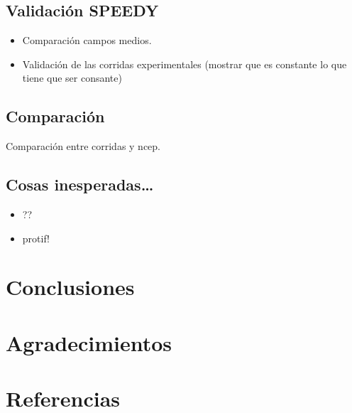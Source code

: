 \documentclass[spanish,a4paper]{book}
\providecommand{\tightlist}{%
  \setlength{\itemsep}{0pt}\setlength{\parskip}{0pt}}
\begin{document}
\section{Validación SPEEDY}\label{validacion-speedy}

\begin{itemize}
\tightlist
\item
  Comparación campos medios.
\item
  Validación de las corridas experimentales (mostrar que es constante lo
  que tiene que ser consante)
\end{itemize}

\section{Comparación}\label{comparacion}

Comparación entre corridas y ncep.

\section{Cosas inesperadas\ldots{}}\label{cosas-inesperadas}

\begin{itemize}
\tightlist
\item
  ??
\item
  protif!
\end{itemize}

\chapter{Conclusiones}\label{conclusiones}

\chapter{Agradecimientos}\label{agradecimientos}

\chapter{Referencias}\label{referencias}
\end{document}
